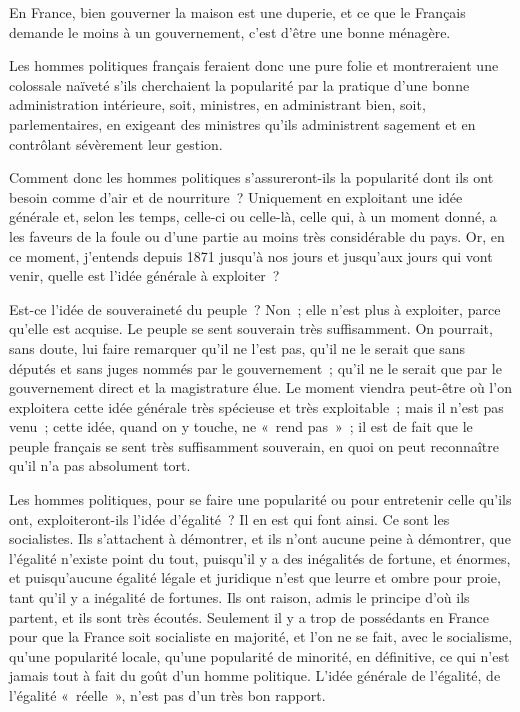 \documentclass[french,twoside]{book} %
\begin{document}
En France, bien gouverner la maison est une duperie, et ce que le Français demande le moins à un gouvernement, c’est d’être une bonne ménagère.\par
Les hommes politiques français feraient donc une pure folie et montreraient une colossale naïveté s’ils cherchaient la popularité par la pratique d’une bonne administration intérieure, soit, ministres, en administrant bien, soit, parlementaires, en exigeant des ministres qu’ils administrent sagement et en contrôlant sévèrement leur gestion.\par
Comment donc les hommes politiques s’assureront-ils la popularité dont ils ont besoin comme d’air et de nourriture ? Uniquement en exploitant une idée générale et, selon les temps, celle-ci ou celle-là, celle qui, à un moment donné, a les faveurs de la foule ou d’une partie au moins très considérable du pays. Or, en ce moment, j’entends depuis 1871 jusqu’à nos jours et jusqu’aux jours qui  vont venir, quelle est l’idée générale à exploiter ?\par
Est-ce l’idée de souveraineté du peuple ? Non ; elle n’est plus à exploiter, parce qu’elle est acquise. Le peuple se sent souverain très suffisamment. On pourrait, sans doute, lui faire remarquer qu’il ne l’est pas, qu’il ne le serait que sans députés et sans juges nommés par le gouvernement ; qu’il ne le serait que par le gouvernement direct et la magistrature élue. Le moment viendra peut-être où l’on exploitera cette idée générale très spécieuse et très exploitable ; mais il n’est pas venu ; cette idée, quand on y touche, ne « rend pas » ; il est de fait que le peuple français se sent très suffisamment souverain, en quoi on peut reconnaître qu’il n’a pas absolument tort.\par
Les hommes politiques, pour se faire une popularité ou pour entretenir celle qu’ils ont, exploiteront-ils l’idée d’égalité ? Il en est qui font ainsi. Ce sont les socialistes. Ils s’attachent à démontrer, et ils n’ont aucune peine à démontrer, que l’égalité n’existe point du tout, puisqu’il y a des inégalités de fortune, et énormes, et puisqu’aucune égalité légale et juridique n’est que leurre et ombre pour proie, tant qu’il y a inégalité de fortunes. Ils ont raison, admis le principe d’où ils partent, et ils sont très écoutés. Seulement il y a trop de possédants en France pour que la France soit socialiste  en majorité, et l’on ne se fait, avec le socialisme, qu’une popularité locale, qu’une popularité de minorité, en définitive, ce qui n’est jamais tout à fait du goût d’un homme politique. L’idée générale de l’égalité, de l’égalité « réelle », n’est pas d’un très bon rapport.\par
\end{document}
